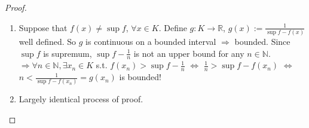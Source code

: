 \documentclass[12pt]{report}
\theoremstyle{definition}
\begin{document}
\begin{proof}
   \begin{enumerate}[label = (\arabic*)]
       \item Suppose that $f(x) \neq \sup{f}$, $\forall x \in K$.
           Define $g:K\rightarrow{}\mathbb{R}$, $g(x) := \frac{1}{\sup{f} - f(x)}$ well defined.
           So $g$ is continuous on a bounded interval $\Rightarrow{}$ bounded.
           Since $\sup{f}$ is supremum, $\sup{f} - \frac{1}{n}$ 
           is not an upper bound for any $n \in \mathbb{N}$.
           $\Rightarrow{} \forall n \in \mathbb{N}, \exists x_n \in K$ s.t. 
           $f(x_n) > \sup{f} - \frac{1}{n}$ $\iff$
           $\frac{1}{n}>\sup{f} - f(x_n)$ $\iff$
           $n < \frac{1}{\sup{f} - f(x_n)} = g(x_n)$ is bounded!

       \item Largely identical process of proof.
   \end{enumerate}
   
\end{proof}





\end{document}
